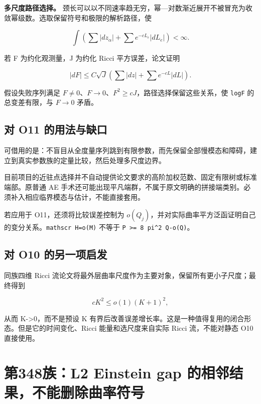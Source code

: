 \documentclass[UTF8,11pt,openany,oneside,fontset=none]{ctexbook}
\begin{document}
\textbf{多尺度路径选择。} 颈长可以以不同速率趋无穷，幂---对数渐近展开不被冒充为收敛幂级数。选取保留符号和极限的解析路径，使

\[
\int\left(\sum|dz_\alpha|+\sum e^{-cL_e}|dL_e|\right)<\infty.
\]

若 F 为约化观测量，J 为约化 Ricci 平方误差，论文证明

\[
|dF|\le C\sqrt J\left(\sum|dz|+\sum e^{-cL}|dL|\right).
\]

假设失败序列满足 \(F\ne0\)、\(F\to0\)、\(F^2\ge cJ\)，路径选择保留这些关系，使 \texttt{log\textbar{}F\textbar{}} 的总变差有限，与 \(F\to0\) 矛盾。

\subsection{对 O11 的用法与缺口}\label{ch6:ux5bf9-o11-ux7684ux7528ux6cd5ux4e0eux7f3aux53e3}

可借用的是：不盲目从全度量序列跳到有限参数，而先保留全部慢模态和障碍，建立到真实参数族的定量比较，然后处理多尺度边界。

目前项目的近驻点选择并不自动提供论文要求的高阶加权范数、固定有限树或标准端部。原普通 AE 手术还可能出现平凡端群，不属于原文明确的拼接端类别。必须补入相应临界模态与估计，不能直接套用。

若应用于 O11，还须将比较误差控制为 \(o(Q_j)\)，并对实际曲率平方泛函证明自己的变分关系。\texttt{mathscr\ H=o(M)} 不等于 \texttt{P\ \textgreater{}=\ 8\ pi\^{}2\ Q-o(Q)}。

\subsection{对 O10 的另一项启发}\label{ch6:ux5bf9-o10-ux7684ux53e6ux4e00ux9879ux542fux53d1}

同族四维 Ricci 流论文将最外层曲率尺度作为主要对象，保留所有更小子尺度；最终得到

\[
cK^2\le o(1)(K+1)^2,
\]

从而 K-\textgreater0，而不是预设 K 有界后改善误差增长率。这是一种值得复用的闭合形态。但是它的时间变化、Ricci 能量和选尺度来自实际 Ricci 流，不能对静态 O10 直接使用。

\section{第348族：L2 Einstein gap 的相邻结果，不能删除曲率符号}\label{ch6:ux7b2c348ux65cfl2-einstein-gap-ux7684ux76f8ux90bbux7ed3ux679cux4e0dux80fdux5220ux9664ux66f2ux7387ux7b26ux53f7}
\end{document}
